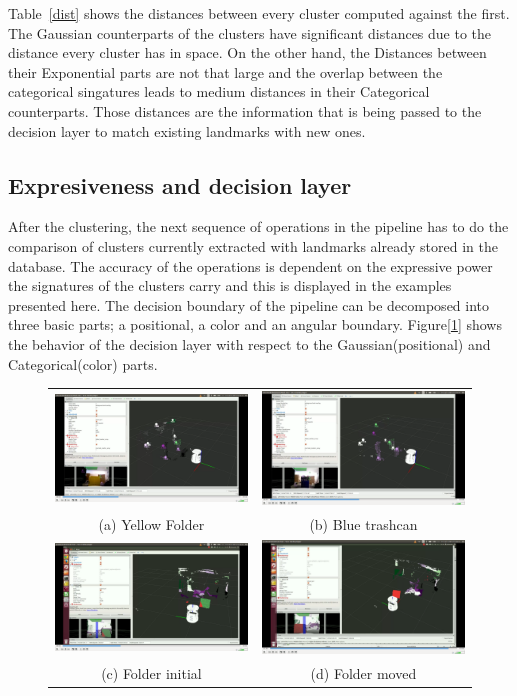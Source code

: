 \documentclass[]{article}
\begin{document}
    Table~\ref{dist} shows the distances between every cluster computed against the first. The Gaussian counterparts of the clusters have significant distances due to the distance every cluster has in space. On the other hand, the Distances between their Exponential parts are not that large and the overlap between the categorical singatures leads to medium distances in their Categorical counterparts. Those distances are the information that is being passed to the decision layer to match existing landmarks with new ones. 

\subsection{Expresiveness and decision layer}

After the clustering, the next sequence of operations in the pipeline has to do the comparison of clusters currently extracted with landmarks already stored in the database. The accuracy of the operations is dependent on the expressive power the signatures of the clusters carry and this is displayed in the examples presented here. The decision boundary of the pipeline can be decomposed into three basic parts; a positional, a color and an angular boundary. Figure[\ref{pip:bounds}] shows the behavior of the decision layer with respect to the Gaussian(positional) and Categorical(color) parts. 

    \begin{figure}
        \begin{tabular}{cc}
            \includegraphics[width=.3\textwidth]{colorBound} &   \includegraphics[width=.3\textwidth]{colorBound2} \\
            (a) Yellow Folder& (b) Blue trashcan \\[6pt]
            \includegraphics[width=.3\textwidth]{posBound} &   \includegraphics[width=.3\textwidth]{posBound2} \\
            (c) Folder initial  & (d) Folder moved \\[6pt]
        \end{tabular}
        \label{pip:bounds}
    \end{figure}
\end{document}
